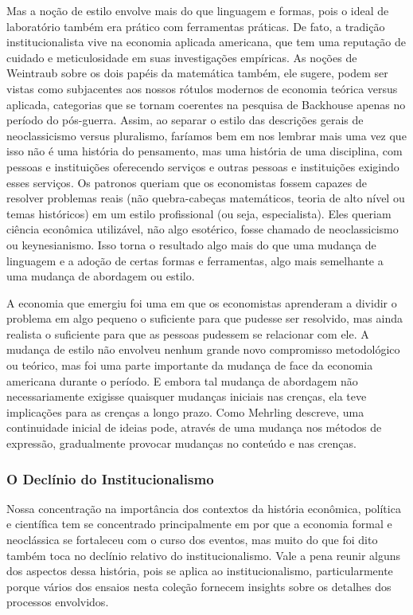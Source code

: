 \documentclass[a4paper,12pt]{article}[abntex2]
\begin{document}
Mas a noção de estilo envolve mais do que linguagem e formas, pois o ideal de laboratório também era prático com ferramentas práticas. De fato, a tradição institucionalista vive na economia aplicada americana, que tem uma reputação de cuidado e meticulosidade em suas investigações empíricas. As noções de Weintraub sobre os dois papéis da matemática também, ele sugere, podem ser vistas como subjacentes aos nossos rótulos modernos de economia teórica versus aplicada, categorias que se tornam coerentes na pesquisa de Backhouse apenas no período do pós-guerra. Assim, ao separar o estilo das descrições gerais de neoclassicismo versus pluralismo, faríamos bem em nos lembrar mais uma vez que isso não é uma história do pensamento, mas uma história de uma disciplina, com pessoas e instituições oferecendo serviços e outras pessoas e instituições exigindo esses serviços. Os patronos queriam que os economistas fossem capazes de resolver problemas reais (não quebra-cabeças matemáticos, teoria de alto nível ou temas históricos) em um estilo profissional (ou seja, especialista). Eles queriam ciência econômica utilizável, não algo esotérico, fosse chamado de neoclassicismo ou keynesianismo. Isso torna o resultado algo mais do que uma mudança de linguagem e a adoção de certas formas e ferramentas, algo mais semelhante a uma mudança de abordagem ou estilo.

A economia que emergiu foi uma em que os economistas aprenderam a dividir o problema em algo pequeno o suficiente para que pudesse ser resolvido, mas ainda realista o suficiente para que as pessoas pudessem se relacionar com ele. A mudança de estilo não envolveu nenhum grande novo compromisso metodológico ou teórico, mas foi uma parte importante da mudança de face da economia americana durante o período. E embora tal mudança de abordagem não necessariamente exigisse quaisquer mudanças iniciais nas crenças, ela teve implicações para as crenças a longo prazo. Como Mehrling descreve, uma continuidade inicial de ideias pode, através de uma mudança nos métodos de expressão, gradualmente provocar mudanças no conteúdo e nas crenças.

\subsubsection{\textbf{O Declínio do Institucionalismo}}

Nossa concentração na importância dos contextos da história econômica, política e científica tem se concentrado principalmente em por que a economia formal e neoclássica se fortaleceu com o curso dos eventos, mas muito do que foi dito também toca no declínio relativo do institucionalismo. Vale a pena reunir alguns dos aspectos dessa história, pois se aplica ao institucionalismo, particularmente porque vários dos ensaios nesta coleção fornecem insights sobre os detalhes dos processos envolvidos.
\end{document}
